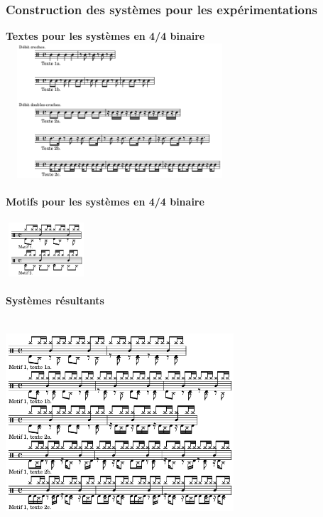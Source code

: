 \subsubsection{Construction des systèmes pour les expérimentations}
\textbf{Textes pour les systèmes en 4/4 binaire}\\
\includegraphics[height=50mm, width=85mm]{z_images/1_description_notation/systemes/0_textes_4-4_binaires.png}\\\\
\textbf{Motifs pour les systèmes en 4/4 binaire}\\\\
\includegraphics[height=20mm, width=30mm]{z_images/1_description_notation/systemes/1_motifs_4-4_binaires.png}\\\\
\textbf{Systèmes résultants}\\\\
\includegraphics[height=75mm, width=85mm]{z_images/3_experimentations/experience_1/systeme_recherche_1.png}
